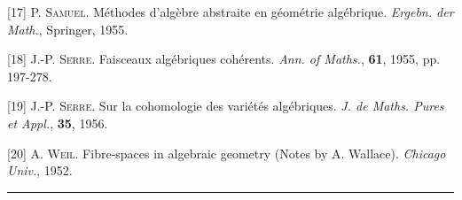 
[17] P. \textsc{Samuel}. Méthodes d'algèbre abstraite en géométrie algébrique. \textit{Ergebn. der Math.}, Springer, 1955.

[18] J.-P. \textsc{Serre}. Faisceaux algébriques cohérents. \textit{Ann. of Maths.}, \textbf{61}, 1955, pp. 197-278.

[19] J.-P. \textsc{Serre}. Sur la cohomologie des variétés algébriques. \textit{J. de Maths. Pures et Appl.}, \textbf{35}, 1956.

[20] A. \textsc{Weil}. Fibre-spaces in algebraic geometry (Notes by A. Wallace). \textit{Chicago Univ.}, 1952.

\begin{center}\rule{4cm}{0.4pt}\end{center}
